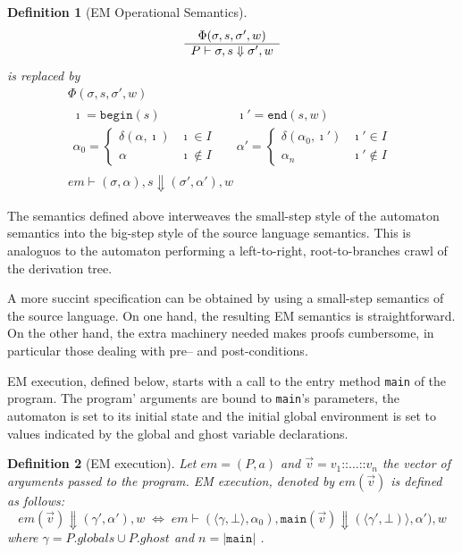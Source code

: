 \documentclass[10pt,notitlepage,twoside]{article}
\newcommand{\aut}{a}
\newcommand{\qu}{\alpha}
\newcommand{\cons}{\texttt{::}}
\newcommand{\eval}[2]{P \vdash #1 \Downarrow #2}
\newcommand{\emeval}[2]{em \vdash #1 \Downarrow #2}
\newcommand{\state}[1]{\langle #1 \rangle}
\newcommand{\genv}{\gamma}
\newtheorem{definition}{Definition}
\begin{document}
\begin{definition}[EM Operational Semantics]
\begin{displaymath}
\begin{array}{c}
\Phi(\sigma,s,\sigma',w) \\
\hline
\eval{\sigma,s}{\sigma',w}
\end{array} \\
\end{displaymath}
is replaced by
\begin{displaymath}
\begin{array}{c}
\Phi(\sigma,s,\sigma',w)  \\
\begin{array}{ccc}
\imath = \texttt{begin}(s) & & \imath' = \texttt{end}(s,w) \\
\qu_0 = \left \{ \begin{array}{ll}
\delta(\qu,\imath) & \imath \in I \\
\qu & \imath \not\in I
\end{array} \right . 
& & 
\qu' = \left \{ \begin{array}{ll} 
\delta(\qu_0,\imath') & \imath' \in I \\
\qu_n & \imath' \not\in I
\end{array} \right . 

\end{array} \\
\hline
em \vdash (\sigma,\qu),s \Downarrow (\sigma',\qu'),w
\end{array}
\end{displaymath}

\end{definition}

The semantics defined above interweaves the small-step style of the automaton semantics into the big-step style of the source language semantics. This is analoguos to the automaton performing a left-to-right, root-to-branches crawl of the derivation tree. 

A more succint specification can be obtained by using a small-step semantics of the source language. On one hand, the resulting EM semantics is straightforward. On the other hand, the extra machinery needed makes proofs cumbersome, in particular those dealing with pre-- and post-conditions.

EM execution, defined below, starts with a call to the entry method \texttt{main} of the program. The program' arguments are bound to \texttt{main}'s parameters, the automaton is set to its initial state and the initial global environment is set to values indicated by the global and ghost variable declarations.

\begin{definition}[EM execution]\label{def:em-execution}
Let $em = (P,\aut)$ and  $\vec{v} = v_1\cons\ldots\cons v_n$ the vector of arguments passed to the program. EM execution, denoted by $em(\vec{v})$ is defined as follows:
\begin{displaymath}
em(\vec{v}) \Downarrow (\genv',\qu'),w \;\Leftrightarrow\;  \emeval{(\state{\genv,\bot},\qu_0),\texttt{main}(\vec{v})}{(\state{\genv',\bot)},\qu'),w}
\end{displaymath}
where $\genv = P.\mathit{globals} \cup P.\mathit{ghost}$ and $n = |\texttt{main}|$ .
\end{definition}
\end{document}

